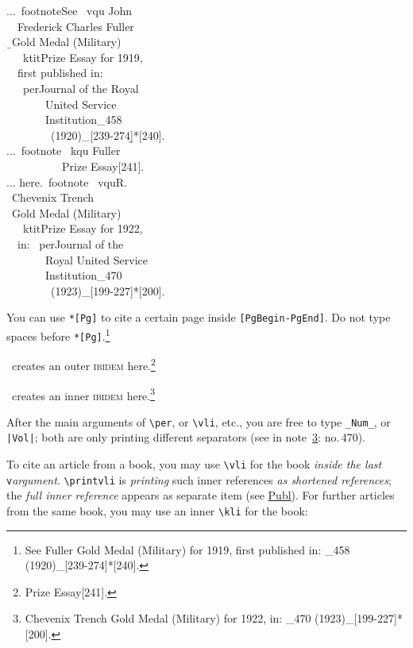 \documentclass[12pt,a4paper]{article}
\newcommand{\pbs}{\string\ \unskip}
\newcommand{\bs}{\protect\pbs}
\renewcommand{\{}{{\normalfont\lbashortmem}}
\renewcommand{\}}{{\normalfont\rbashortmem}}
\begin{document}
\Doppelbox
{
...\bs footnote\{See \bs vqu \{John 
\\ \ \ Frederick Charles\} \{Fuller\} 
\\ \ \b{\{}Gold Medal (Military) 
\\ \ \ \bs ktit\{Prize Essay\} for 1919, 
\\ \ \ first published in: 
\\ \ \ \bs per\{Journal of the Royal 
\\ \ \ \ \ \ \ \ United Service 
\\ \ \ \ \ \ \ \ Institution\}\string_458 
\\ \ \ \ \ \ \ \ \ (1920)\string_[239-274]\b{\}}*[240].\}
\\[1.5ex]
...\bs footnote\{ \bs kqu \{Fuller\} 
\\ \ \ \ \ \ \ \ \ \ \ \{Prize Essay\}[241].\}
\\[1.5ex]
... here.\bs footnote\{ \bs vqu\{R.\} 
\\ \ \{Chevenix Trench\} 
\\ \ \{Gold Medal (Military) 
\\ \ \ \bs ktit\{Prize Essay\} for 1922, 
\\ \ \ in: \bs per\{Journal of the 
\\ \ \ \ \ \ \ \ Royal United Service 
\\ \ \ \ \ \ \ \ Institution\}\string_470 
\\ \ \ \ \ \ \ \ \ (1923)\string_[199-227]\}*[200].\}
}
{
You can use \texttt{*[Pg]} to cite a
certain page inside \texttt{[PgBegin-PgEnd]}.
Do not type spaces before \texttt{*[Pg]}.\footnote{See 
 {Fuller} 
{Gold Medal (Military)  for 1919, 
first published in: _458 (1920)_[239-274]}*[240].}

\BibArts\ creates an outer \textsc{ibidem} 
here.\footnote{  {Prize Essay}[241].}

\BibArts\ creates an inner \textsc{ibidem} 
here.\footnote{  
{Chevenix Trench} 
{Gold Medal (Military)  for 1922, 
in: _470 (1923)_[199-227]}*[200].\label{third}}
}

 \noindent 
 After the main arguments of \verb|\per|, or \verb|\vli|, etc., you are free
 to type \verb+_Num_+, or \verb+|Vol|+; both are only printing different
 separators (see in note~\ref{third}: {\footnotesize no.\,470}).

 \noindent
 To cite an article from a book, you may use \verb|\vli| for the book 
 \textit{inside the last} \texttt{v}\textit{\fhy argument}. 
 \verb|\printvli| is \textit{printing} such inner references 
 \textit{as shortened references}; the \textit{full inner reference} 
 appears as separate item (see \underline{Publ}). For further articles from 
 the same book, you may use an inner \verb|\kli| for the book:
\end{document}
